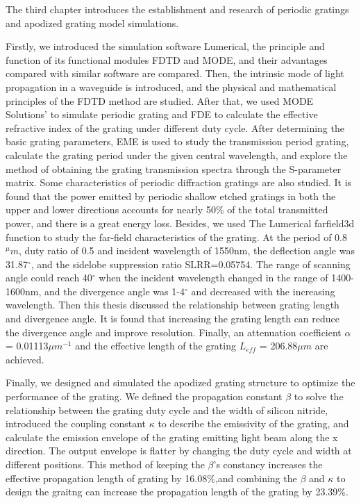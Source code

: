 \documentclass[UTF8,a4paper,12pt]{ctexart}
\numberwithin{equation}{section}
\begin{document}
The third chapter introduces the establishment and research of periodic gratings and apodized grating model simulations.

Firstly, we introduced the simulation software Lumerical, the principle and function of its functional modules FDTD and MODE, and their advantages compared with similar software are compared. Then, the intrinsic mode of light propagation in a waveguide is introduced, and the physical and mathematical principles of the FDTD method are studied. After that, we used MODE Solutions' to simulate periodic grating and FDE to calculate the effective refractive index of the grating under different duty cycle. After determining the basic grating parameters, EME is used to study the transmission period grating, calculate the grating period under the given central wavelength, and explore the method of obtaining the grating transmission spectra through the S-parameter matrix. Some characteristics of periodic diffraction gratings are also studied. It is found that the power emitted by periodic shallow etched gratings in both the upper and lower directions accounts for nearly 50\% of the total transmitted power, and there is a great energy loss. Besides, we used The Lumerical farfield3d function to study the far-field characteristics of the grating. At the period of 0.8$^\mu m$, duty ratio of 0.5 and incident wavelength of 1550nm, the deflection angle was 31.87$^\circ$, and the sidelobe suppression ratio SLRR=0.05754. The range of scanning angle could reach 40$^\circ$ when the incident wavelength changed in the range of 1400-1600nm, and the divergence angle was 1-4$^\circ$ and decreased with the increasing wavelength. Then this thesis discussed the relationship between grating length and divergence angle. It is found that increasing the grating length can reduce the divergence angle and improve resolution. Finally, an attenuation coefficient $\alpha$ = 0.01113$\mu m^{-1}$ and the effective length of the grating $L_{eff}$ = 206.88$\mu m$ are 
achieved.

Finally, we designed and simulated the apodized grating structure to optimize the performance of the grating. We defined the propagation constant $\beta$ to solve the relationship between the grating duty cycle and the width of silicon nitride, introduced the coupling constant $\kappa$ to describe the emissivity of the grating, and calculate the emission envelope of the grating emitting light beam along the x direction. The output envelope is flatter by changing the duty cycle and width at different positions. This method of keeping the $\beta$'s constancy increases the effective propagation length of grating by 16.08\%,and combining the $\beta$ and $\kappa$ to design the graitng can increase the propagation length of the grating by 23.39\%.
\end{document}
